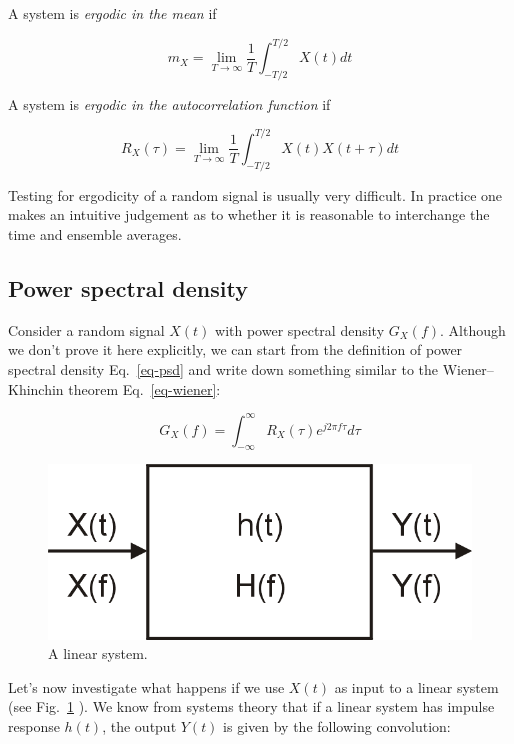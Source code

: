 A system is \emph{ergodic in the mean} if

\begin{equation}
m_X = \lim_{T \to \infty} \frac{1}{T} \int_{-T/2}^{T/2} X(t) dt
\end{equation} 

A system is \emph{ergodic in the autocorrelation function} if

\begin{equation}
R_X(\tau) = \lim_{T \to \infty} \frac{1}{T} \int_{-T/2}^{T/2} X(t) X(t+\tau) dt
\end{equation} 

Testing for ergodicity of a random signal is usually very difficult. In practice one makes an intuitive judgement as to whether it is reasonable to interchange the time and ensemble averages.

\subsection{Power spectral density}

Consider a random signal $X(t)$ with power spectral density $G_X(f)$. Although we don't prove it here explicitly, we can start from the definition of power spectral density Eq.~\ref{eq-psd} and write down something similar to the Wiener--Khinchin theorem Eq.~\ref{eq-wiener}:

\begin{equation}
G_X(f) = \int_{-\infty}^{\infty} R_X(\tau) e^{j 2 \pi f \tau} d \tau \label{eq-wiener-random}
\end{equation} 

\begin{figure}
\centering
\includegraphics{stochastic/figures/linsys}
\caption{A linear system.}
\label{fig-linsys}
\end{figure}

Let's now investigate what happens if we use $X(t)$ as input to a linear system (see Fig.~\ref{fig-linsys} ). We know from systems theory that if a linear system has impulse response $h(t)$, the output $Y(t)$ is given by the following convolution:

